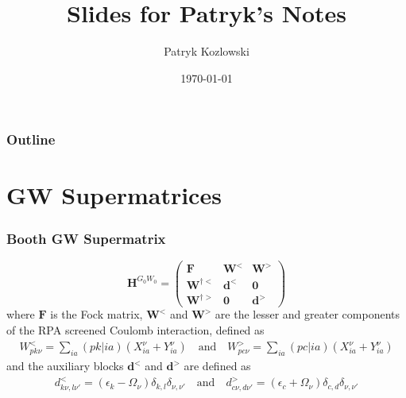 \documentclass{beamer}
\title{Slides for Patryk's Notes}
\author{Patryk Kozlowski}
\date{\today}
\begin{document}
\begin{frame}
    \titlepage
\end{frame}
\begin{frame}
  \frametitle{Outline}
  \tableofcontents
\end{frame}
\section{GW Supermatrices}
\begin{frame}
    \frametitle{Booth GW Supermatrix}

\begin{equation}
    \bm{H}^{G_0 W_0} = \begin{pmatrix} \bm{F} & \bm{W}^< & \bm{W}^> \\ \bm{W}^{\dagger<} & \bm{d}^< & \bm{0} \\ \bm{W}^{\dagger>} & \bm{0} & \bm{d}^> \end{pmatrix}
\end{equation}
where $\bm{F}$ is the Fock matrix, $\bm{W}^<$ and $\bm{W}^>$ are the lesser and greater components of the RPA screened Coulomb interaction, defined as
\begin{equation}
\begin{split}
    W_{pk\nu}^{<} = \sum_{ia} (pk|ia) \left( X_{ia}^{\nu} + Y_{ia}^{\nu} \right) \quad \text{and} \quad W_{pc\nu}^{>} = \sum_{ia} (pc|ia) \left( X_{ia}^{\nu} + Y_{ia}^{\nu} \right)
\end{split}
\end{equation}
and the auxiliary blocks $\bm{d}^<$ and $\bm{d}^>$ are defined as
\begin{equation}
\begin{split}
    d_{k\nu,l\nu'}^{<} = \left(\epsilon_k - \Omega_\nu\right) \delta_{k,l} \delta_{\nu,\nu'}\quad \text{and} \quad
    d_{c\nu,d\nu'}^{>} = \left(\epsilon_c + \Omega_\nu\right) \delta_{c,d} \delta_{\nu,\nu'}\\
\end{split}
\end{equation}

\end{frame}
\end{document}
